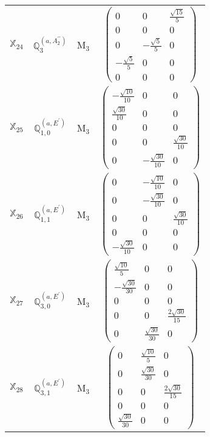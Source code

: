 \documentclass[fleqn,10pt,landscape]{article}
\begin{document}
\begin{itemize}
\begin{center}
\begin{longtable}{c|c|c|c}
$ \mathbb{X}_{24} $ & $\mathbb{Q}_{3}^{(a,A_{2}^{\prime\prime})}$ & M$_{3}$ & $\begin{pmatrix} 0 & 0 & \frac{\sqrt{15}}{5} \\ 0 & 0 & 0 \\ 0 & - \frac{\sqrt{5}}{5} & 0 \\ - \frac{\sqrt{5}}{5} & 0 & 0 \\ 0 & 0 & 0 \end{pmatrix}$ \\
$ \mathbb{X}_{25} $ & $\mathbb{Q}_{1,0}^{(a,E^{\prime})}$ & M$_{3}$ & $\begin{pmatrix} - \frac{\sqrt{10}}{10} & 0 & 0 \\ \frac{\sqrt{30}}{10} & 0 & 0 \\ 0 & 0 & 0 \\ 0 & 0 & \frac{\sqrt{30}}{10} \\ 0 & - \frac{\sqrt{30}}{10} & 0 \end{pmatrix}$ \\
$ \mathbb{X}_{26} $ & $\mathbb{Q}_{1,1}^{(a,E^{\prime})}$ & M$_{3}$ & $\begin{pmatrix} 0 & - \frac{\sqrt{10}}{10} & 0 \\ 0 & - \frac{\sqrt{30}}{10} & 0 \\ 0 & 0 & \frac{\sqrt{30}}{10} \\ 0 & 0 & 0 \\ - \frac{\sqrt{30}}{10} & 0 & 0 \end{pmatrix}$ \\
$ \mathbb{X}_{27} $ & $\mathbb{Q}_{3,0}^{(a,E^{\prime})}$ & M$_{3}$ & $\begin{pmatrix} \frac{\sqrt{10}}{5} & 0 & 0 \\ - \frac{\sqrt{30}}{30} & 0 & 0 \\ 0 & 0 & 0 \\ 0 & 0 & \frac{2 \sqrt{30}}{15} \\ 0 & \frac{\sqrt{30}}{30} & 0 \end{pmatrix}$ \\
$ \mathbb{X}_{28} $ & $\mathbb{Q}_{3,1}^{(a,E^{\prime})}$ & M$_{3}$ & $\begin{pmatrix} 0 & \frac{\sqrt{10}}{5} & 0 \\ 0 & \frac{\sqrt{30}}{30} & 0 \\ 0 & 0 & \frac{2 \sqrt{30}}{15} \\ 0 & 0 & 0 \\ \frac{\sqrt{30}}{30} & 0 & 0 \end{pmatrix}$ \\

\end{longtable}
\end{center}
\end{itemize}
\end{document}

